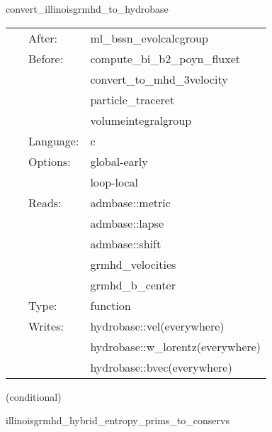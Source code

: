 \documentclass{article}
\begin{document}
\hspace{5mm} convert\_illinoisgrmhd\_to\_hydrobase 

\hspace{5mm}{\it convert illinoisgrmhd-native variables to hydrobase } 


\hspace{5mm}

 \begin{tabular*}{160mm}{cll} 
~ & After:  & ml\_bssn\_evolcalcgroup \\ 
~ & Before:  & compute\_bi\_b2\_poyn\_fluxet \\ 
~& ~ &convert\_to\_mhd\_3velocity\\ 
~& ~ &particle\_traceret\\ 
~& ~ &volumeintegralgroup\\ 
~ & Language:  & c \\ 
~ & Options:  & global-early \\ 
~& ~ &loop-local\\ 
~ & Reads:  & admbase::metric \\ 
~& ~ &admbase::lapse\\ 
~& ~ &admbase::shift\\ 
~& ~ &grmhd\_velocities\\ 
~& ~ &grmhd\_b\_center\\ 
~ & Type:  & function \\ 
~ & Writes:  & hydrobase::vel(everywhere) \\ 
~& ~ &hydrobase::w\_lorentz(everywhere)\\ 
~& ~ &hydrobase::bvec(everywhere)\\ 
\end{tabular*} 


\vspace{5mm}

   (conditional) 

\hspace{5mm} illinoisgrmhd\_hybrid\_entropy\_prims\_to\_conservs 

\hspace{5mm}{\it entropy+hybrid version of illinoisgrmhd\_prims\_to\_conservs } 


\hspace{5mm}
\end{document}

